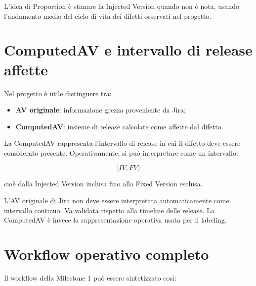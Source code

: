 \begin{notaprof}
L'idea di Proportion è stimare la Injected Version quando non è nota, usando l'andamento medio del ciclo di vita dei difetti osservati nel progetto.
\end{notaprof}

\section{ComputedAV e intervallo di release affette}

Nel progetto è utile distinguere tra:

\begin{itemize}
    \item \textbf{AV originale}: informazione grezza proveniente da Jira;
    \item \textbf{ComputedAV}: insieme di release calcolate come affette dal difetto.
\end{itemize}

La ComputedAV rappresenta l'intervallo di release in cui il difetto deve essere considerato presente. Operativamente, si può interpretare come un intervallo:

\[
    [IV, FV)
\]

cioè dalla Injected Version inclusa fino alla Fixed Version esclusa.

\begin{notaesame}
L'AV originale di Jira non deve essere interpretata automaticamente come intervallo continuo. Va validata rispetto alla timeline delle release. La ComputedAV è invece la rappresentazione operativa usata per il labeling.
\end{notaesame}

\section{Workflow operativo completo}

Il workflow della Milestone 1 può essere sintetizzato così:

